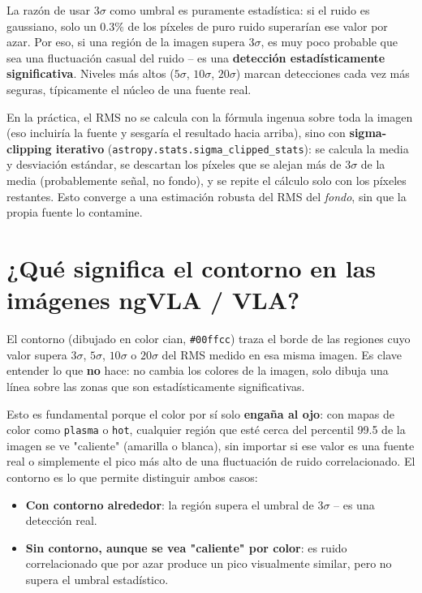 \documentclass[12pt, a4paper]{article}
\begin{document}
La razón de usar $3\sigma$ como umbral es puramente estadística: si el ruido
es gaussiano, solo un $0.3\%$ de los píxeles de puro ruido superarían ese
valor por azar. Por eso, si una región de la imagen supera $3\sigma$, es muy
poco probable que sea una fluctuación casual del ruido -- es una
\textbf{detección estadísticamente significativa}. Niveles más altos
($5\sigma$, $10\sigma$, $20\sigma$) marcan detecciones cada vez más seguras,
típicamente el núcleo de una fuente real.

En la práctica, el RMS no se calcula con la fórmula ingenua sobre toda la
imagen (eso incluiría la fuente y sesgaría el resultado hacia arriba), sino
con \textbf{sigma-clipping iterativo}
(\texttt{astropy.stats.sigma\_clipped\_stats}): se calcula la media y
desviación estándar, se descartan los píxeles que se alejan más de
$3\sigma$ de la media (probablemente señal, no fondo), y se repite el
cálculo solo con los píxeles restantes. Esto converge a una estimación
robusta del RMS del \textit{fondo}, sin que la propia fuente lo contamine.

\section{¿Qué significa el contorno en las imágenes ngVLA / VLA?}

El contorno (dibujado en color cian, \texttt{\#00ffcc}) traza el borde de las
regiones cuyo valor supera $3\sigma$, $5\sigma$, $10\sigma$ o $20\sigma$ del
RMS medido en esa misma imagen. Es clave entender lo que \textbf{no} hace: no
cambia los colores de la imagen, solo dibuja una línea sobre las zonas que
son estadísticamente significativas.

Esto es fundamental porque el color por sí solo \textbf{engaña al ojo}: con
mapas de color como \texttt{plasma} o \texttt{hot}, cualquier región que esté
cerca del percentil 99.5 de la imagen se ve "caliente" (amarilla o blanca),
sin importar si ese valor es una fuente real o simplemente el pico más alto
de una fluctuación de ruido correlacionado. El contorno es lo que permite
distinguir ambos casos:

\begin{itemize}
    \item \textbf{Con contorno alrededor}: la región supera el umbral de
          $3\sigma$ -- es una detección real.
    \item \textbf{Sin contorno, aunque se vea "caliente" por color}: es
          ruido correlacionado que por azar produce un pico visualmente
          similar, pero no supera el umbral estadístico.
\end{itemize}
\end{document}
